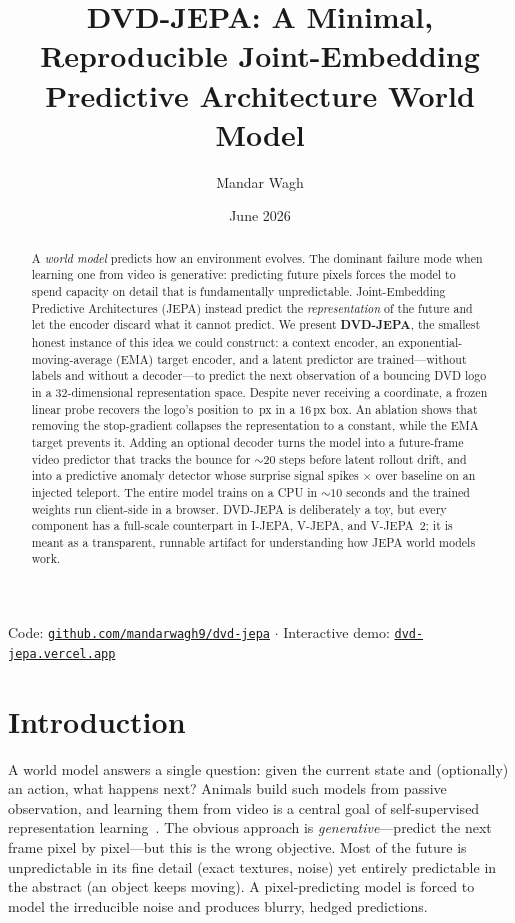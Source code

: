 \documentclass[11pt]{article}
\title{\textbf{DVD-JEPA: A Minimal, Reproducible Joint-Embedding\\
Predictive Architecture World Model}}
\author[1]{Mandar Wagh}
\affil[1]{Black Robotics \quad \texttt{roboticsblack@gmail.com}}
\date{June 2026}
\begin{document}
\maketitle

\vspace{-1.2em}
\begin{center}
\small
Code: \href{https://github.com/mandarwagh9/dvd-jepa}{\texttt{github.com/mandarwagh9/dvd-jepa}} \;$\cdot$\;
Interactive demo: \href{https://dvd-jepa.vercel.app}{\texttt{dvd-jepa.vercel.app}}
\end{center}

\begin{abstract}
\noindent
A \emph{world model} predicts how an environment evolves. The dominant failure mode when learning one
from video is generative: predicting future pixels forces the model to spend capacity on detail that is
fundamentally unpredictable. Joint-Embedding Predictive Architectures (JEPA) instead predict the
\emph{representation} of the future and let the encoder discard what it cannot predict. We present
\textbf{DVD-JEPA}, the smallest honest instance of this idea we could construct: a context encoder, an
exponential-moving-average (EMA) target encoder, and a latent predictor are trained---without labels and
without a decoder---to predict the next observation of a bouncing DVD logo in a $32$-dimensional
representation space. Despite never receiving a coordinate, a frozen linear probe recovers the logo's
position to \ProbeRMSE\,px in a $16$\,px box. An ablation shows that removing the stop-gradient collapses
the representation to a constant, while the EMA target prevents it. Adding an optional decoder turns the
model into a future-frame video predictor that tracks the bounce for ${\sim}20$ steps before latent
rollout drift, and into a predictive anomaly detector whose surprise signal spikes \AnomalyPeak$\times$
over baseline on an injected teleport. The entire model trains on a CPU in ${\sim}10$ seconds and the
trained weights run client-side in a browser. DVD-JEPA is deliberately a toy, but every component has a
full-scale counterpart in I-JEPA, V-JEPA, and V-JEPA~2; it is meant as a transparent, runnable artifact
for understanding how JEPA world models work.
\end{abstract}

\section{Introduction}
A world model answers a single question: given the current state and (optionally) an action, what
happens next? Animals build such models from passive observation, and learning them from video is a
central goal of self-supervised representation learning~\cite{lecun2022,ha2018}. The obvious approach is
\emph{generative}---predict the next frame pixel by pixel---but this is the wrong objective. Most of the
future is unpredictable in its fine detail (exact textures, noise) yet entirely predictable in the
abstract (an object keeps moving). A pixel-predicting model is forced to model the irreducible noise and
produces blurry, hedged predictions.
\end{document}
